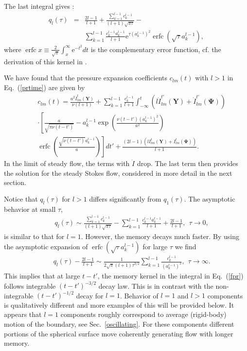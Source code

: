 \documentclass[aps,prx,twocolumn,amsmath,amssymb,amsfonts]{revtex4-2}
\newcommand{\re}{\mathrm{e}}            %
\DeclareMathOperator\erfc{erfc}
\begin{document}
The last integral gives \cite{grad}:
\begin{eqnarray}
q_l(\tau)&=&\frac{2l\!-\!1}{l+1}\!+\! \frac{\sum_{k=1}^{l-1} c_k^{l-1}}{(l+1)\sqrt{\pi \tau}}-\nonumber \\
&& \sum_{k=1}^{l-1} \frac{c_k^{l-1} a_k^{l-1}}{l+1}
\re^{\tau (a_k^{l-1})^2}\erfc\left(\sqrt{\tau}a_k^{l-1}\right), \label{pressurekernel}
\end{eqnarray}
where $\erfc x\!\equiv\! \frac{2}{\sqrt{\pi}}\int_x^{\infty}\! \re^{-t^2} dt$ is the complementary error function, cf. the derivation of this kernel in \cite{rao,Ishimoto}.

We have found that the pressure expansion coefficients $c_{lm}(t)$ with $l>1$ in Eq.~(\ref{prtime}) are given by
\begin{eqnarray}&&
c_{lm}(t)\!=\!\frac{a^2\dot{I}_{lm}^{t}(\bm Y)}{\nu(l\!+\!1)}+\sum_{k=1}^{l-1} \frac{c_k^{l-1}}{l\!+\!1}\int_{-\infty}^{t}\left(l \dot{I}_{lm}^{t'}(\bm Y)\!+\!\dot{I}_{lm}^{t'}(\bm \Psi)\right)
\nonumber\\&&
\cdot \left[\frac{a}{\sqrt{\pi \nu (t-t')}}-a_k^{l-1}\exp\left(\frac{\nu (t-t') (a_k^{l-1})^2}{a^2}\right)\label{fpr}
\right.\\&&\left.
\erfc\left(\!\frac{\sqrt{\nu (t\!-\!t')}a_k^{l-1}}{a}\right)\!\right]dt'\!+\!\frac{(2l\!-\!1)\left(lI_{lm}^{t}(\bm Y)\!+\!I_{lm}^{t}(\bm \Psi)\right)}{l+1}. \nonumber
\end{eqnarray}
In the limit of steady flow, the terms with $\dot I$ drop. The last term then provides the solution for the steady Stokes flow, considered in more detail in the next section.

Notice that $q_l(\tau)$ for $l>1$ differs significantly from $q_1(\tau)$. The asymptotic behavior at small $\tau$,
\begin{eqnarray}&&
q_l(\tau)\sim  \frac{\sum_{k=1}^{l-1} c_k^{l-1}}{(l+1)\sqrt{\pi \tau}}-\sum_{k=1}^{l-1} \frac{c_k^{l-1} a_k^{l-1}}{l+1}\!+\!\frac{2l\!-\!1}{l+1},\ \ \tau\to 0,\nonumber
\end{eqnarray}
is similar to that for $l=1$. However, the memory decays much faster. By using the asymptotic expansion of $\erfc\left(\sqrt{\tau}a_k^{l-1}\right)$ for large $\tau$ we find
\begin{eqnarray}&&
q_l(\tau)\!-\!\frac{2l\!-\!1}{l+1}\sim \frac{1}{2\sqrt{\pi}(l+1)\tau^{3/2}}\sum_{k=1}^{l-1} \frac{c_k^{l-1}}{(a_k^{l-1})^2},\ \ \tau\to \infty.\nonumber
\end{eqnarray}
This implies that at large $t-t'$, the memory kernel in the integral in Eq.~(\ref{fpr}) follows integrable $(t-t')^{-3/2}$ decay law. This is in contrast with the non-integrable $(t-t')^{-1/2}$ decay for $l=1$. Behavior of $l=1$ and $l>1$ components is qualitatively different and more examples of this will be provided below. It appears that $l=1$ components roughly correspond to average (rigid-body) motion of the boundary, see Sec.~\ref{oscillating}. For these components different portions of the spherical surface move coherently generating flow with longer memory.
\end{document}
